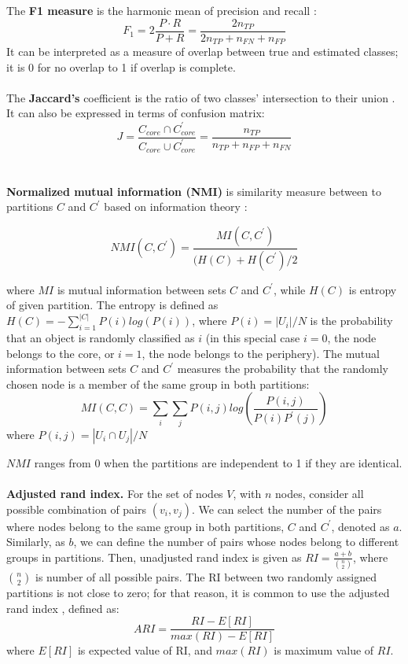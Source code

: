 The \textbf{F1 measure} is the harmonic mean of precision and recall \cite{labatut2012accuracy}:
\begin{equation}
F_1 = 2\frac{P \cdot R}{P+R} = \frac{2n_{TP}}{2n_{TP}+n_{FN} + n_{FP}}
\end{equation}
It can be interpreted as a measure of overlap between true and estimated classes; it is 0 for no overlap to 1 if overlap is complete.\\~\\

The \textbf{Jaccard's} coefficient is the ratio of two classes' intersection to their union \cite{labatut2012accuracy}. It can also be expressed in terms of confusion matrix: 
\begin{equation}
J =  \frac{C_{core} \cap C^{'}_{core}}{C_{core} \cup C^{'}_{core}} =   \frac{n_{TP}}{n_{TP}+n_{FP} + n_{FN}}
\end{equation}
\\~\\
\textbf{Normalized mutual information (NMI)} is similarity measure between to partitions $C$ and $C^{'}$  based on information theory \cite{danon2005comparing}:

\begin{equation}
NMI(C, C^{'}) = \frac{MI(C, C^{'})}{(H(C)+H(C^{'})/2}
\end{equation}

where $MI$ is mutual information between sets $C$ and $C^{'}$, while $H(C)$ is entropy of given partition. The entropy is defined as $H(C) = - \sum_{i=1}^{|C|}P(i)log(P(i))$, where $P(i) = |U_i|/N$ is the probability that an object is randomly classified as $i$ (in this special case $i=0$, the node belongs to the core, or $i=1$, the node belongs to the periphery). The mutual information between sets $C$ and $C^{'}$ measures the probability that the randomly chosen node is a member of the same group in both partitions:
\begin{equation}
MI(C, C) = \sum_i\sum_j P(i, j) log(\frac{P(i,j)}{P(i)P^{'}(j)})    
\end{equation}
where $P(i, j)= |U_i \cap U_j|/N$

$NMI$ ranges from 0 when the partitions are independent to 1 if they are identical.   
\\~\\
\textbf{Adjusted rand index.} For the set of nodes $V$, with $n$ nodes, consider all possible combination of pairs $(v_i, v_j)$. We can select the number of the pairs where nodes belong to the same group in both partitions, $C$ and  $C^{'}$, denoted as $a$. Similarly, as $b$, we can define the number of pairs whose nodes belong to different groups in partitions. Then, unadjusted rand index \cite{santos2009use} is given as $RI = \frac{a+b}{\binom{n}{2}}$, where $\binom{n}{2}$ is number of all possible pairs. The RI between two randomly assigned partitions is not close to zero; for that reason, it is common to use the adjusted rand index \cite{hubert1985comparing} , defined as:
\begin{equation}
ARI = \frac{RI - E[RI]}{max(RI)- E[RI]}
\end{equation}
where $E[RI]$ is expected value of RI, and $max(RI)$ is maximum value of $RI$. 


